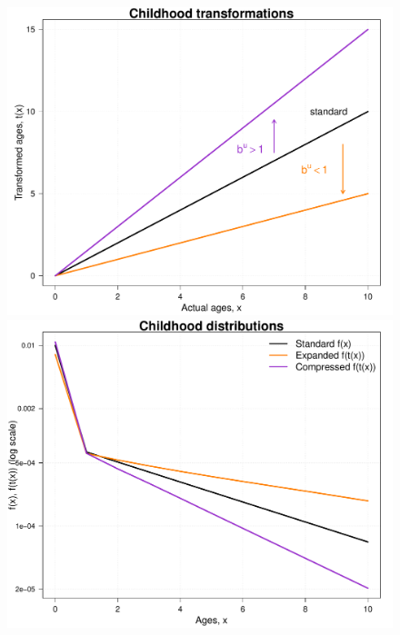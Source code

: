\documentclass[11pt, a4paper]{article}
\begin{document}
\begin{figure}[h!]
\begin{center}
		\includegraphics[scale=0.32]{./Figures/F3c.pdf}\includegraphics[scale=0.32]{./Figures/F3d.pdf}

\end{center}
\end{figure}
\end{document}
